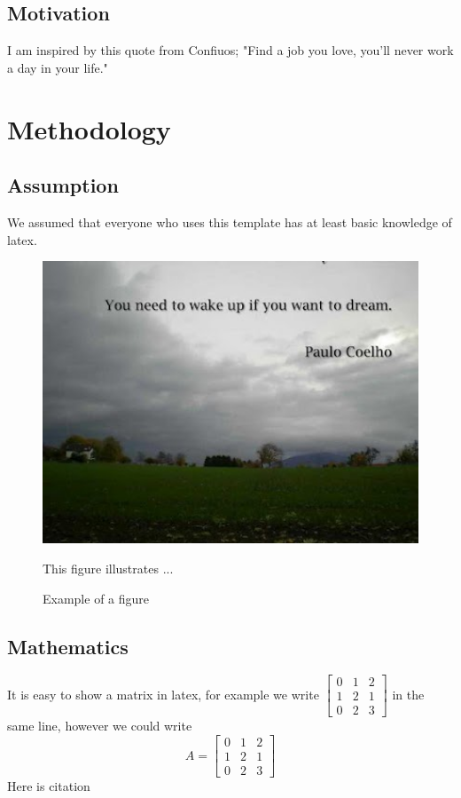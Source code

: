 \documentclass[11pt,a4paper]{report}
\begin{document}
\newpage
\section{Motivation}
I am inspired by this quote from Confiuos; "Find a job you love, you'll never work a day in your life."


\chapter{Methodology}
\label{Methodology}
\newpage
\section{Assumption}
We assumed that everyone who uses this template has at least basic knowledge of latex.
\bigskip
\begin{figure}[hb]
\centering
\includegraphics[width=6in]{figures/dream.png} 
\caption{Example of a figure }
This figure illustrates ...  
\label{fig: dream}
\end{figure}

\section{Mathematics}
It is easy to show a matrix in latex, for example we write 
$\begin{bmatrix}
	0 & 1 & 2 \\
	1 & 2 & 1 \\
	0 & 2 & 3
\end{bmatrix}$
in the same line, however we could write 
\[
	A = \begin{bmatrix}
		0 & 1 & 2 \\
		1 & 2 & 1 \\
		0 & 2 & 3  
	\end{bmatrix}
\]
Here is citation \cite{Prof_Lee}
\end{document}
